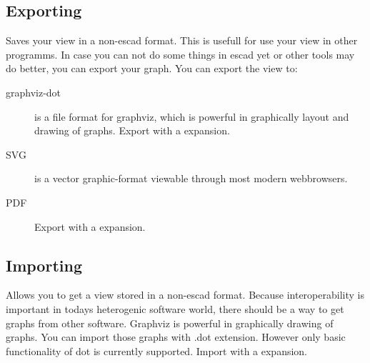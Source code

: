 \documentclass[a4paper, 12pt, openany]{scrbook}
\begin{document}
\subsection{Exporting}
Saves your view in a non-escad format. This is usefull for use your view in other programms.
In case you can not do some things in escad yet or other tools may do better, you can export your graph. You can export the view to:
\begin{description}
\item[graphviz-dot] is a file format for graphviz, which is powerful in graphically layout and drawing of graphs. Export with a expansion.
\item[SVG] is a vector graphic-format viewable through most modern webbrowsers.
\item[PDF] Export with a expansion.
\end{description}
\subsection{Importing}
Allows you to get a view stored in a non-escad format.
Because interoperability is important in todays heterogenic software world, there should be a way to get graphs from other software.
Graphviz is powerful in graphically drawing of graphs. You can import those graphs with .dot extension. However only basic functionality of dot is currently supported. Import with a expansion.
\end{document}
